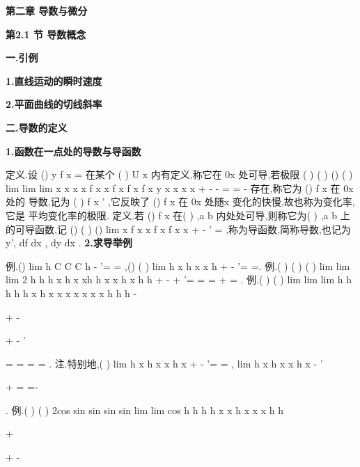 \begin{center}
{\Large \bfseries \textcolor{lyred}{第二章 导数与微分}}
\end{center}

\vspace{6pt}
{\large \bfseries \textcolor{lyred}{第2.1 节 导数概念}}

\vspace{4pt}
{\bfseries \textcolor{lyred}{一.引例}}

{\bfseries \textcolor{lyred}{1.直线运动的瞬时速度}}

{\bfseries \textcolor{lyred}{2.平面曲线的切线斜率}}

\vspace{4pt}
{\bfseries \textcolor{lyred}{二.导数的定义}}

{\bfseries \textcolor{lyred}{1.函数在一点处的导数与导函数}}

\textcolor{lyred}{定义}.设
()
y
f x
=
在某个
(
)
U x
内有定义,称它在
0x 处\textcolor{lyred}{可导},若极限 
(
)
(
)
()
(
)
lim
lim
lim
x
x
x
x
f x
x
f x
f x
f x
y
x
x
x
x
\Delta \to 
\Delta \to 
\to 
+\Delta 
-
-
\Delta =
=
\Delta 
\Delta 
-
存在,称它为
()
f x 在
0x 处的 
\textcolor{lyred}{导数},记为
(
)
f
x
'
,它反映了
()
f x 在
0x 处随x 变化的快慢,故也称为\textcolor{lyred}{变化率},它是 
平均变化率的极限. 
\textcolor{lyred}{定义}.若
()
f x 在(
)
,a b 内处处\textcolor{lyred}{可导},则称它为(
)
,a b 上的\textcolor{lyred}{可导函数},记 
()
(
)
()
lim
x
f x
x
f x
f
x
x
\Delta \to 
+\Delta 
-
'
=
\Delta 
,称为\textcolor{lyred}{导函数},简称\textcolor{lyred}{导数},也记为y', df
dx , dy
dx . 
{\bfseries \textcolor{lyred}{2.求导举例}}

\textcolor{lyred}{例}.()
lim
h
C
C
C
h
\to 
-
'=
=
,()
(
)
lim
h
x
h
x
x
h
\to 
+
-
'=
=. 
\textcolor{lyred}{例}.(
)
(
)
(
)
lim
lim
lim 2
h
h
h
x
h
x
xh
h
x
x
h
x
h
h
\to 
\to 
\to 
+
-
+
'=
=
=
+
=
. 
\textcolor{lyred}{例}.(
)
(
)
lim
lim
lim
h
h
h
h
h
x
h
x
x
x
x
x
x
x
h
h
h
\mu 
\mu 
\mu 
\mu 
\mu 
\mu 
\mu 
\mu 
\mu 
-
\to 
\to 
\to 


+
-
\cdots 


+
-
'


=
=
=
=
. 
\textcolor{lyred}{注}.特别地,(
)
lim
h
x
h
x
x
h
x
\to 
+
-
'=
=
,
lim
h
x
h
x
x
h
x
\to 
-
'


+
=
=-




. 
\textcolor{lyred}{例}.(
)
(
)
2cos
sin
sin
sin
sin
lim
lim
cos
h
h
h
h
x
x
h
x
x
x
h
h
\to 
\to 


+


+
-


